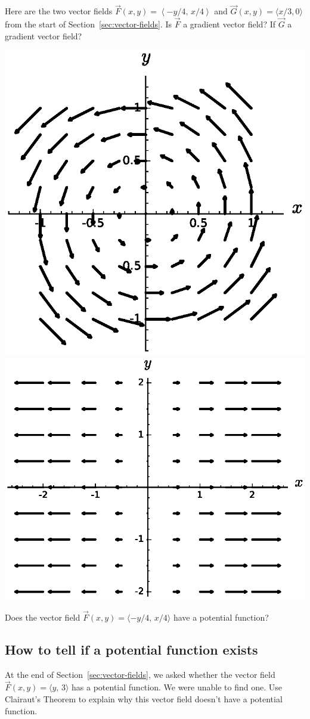 \begin{ex}
    Here are the two vector fields $\vec{F}(x,y)=\left\langle -y/4,\, x/4\right\rangle$ and $\vec{G}(x,y)=\langle x/3,0\rangle$ from the start of Section~\ref{sec:vector-fields}. Is $\vec{F}$ a gradient vector field? If $\vec{G}$ a gradient vector field?
    
    \includegraphics[width=.35\textwidth]{images/vf1.eps} \hfill 
    \includegraphics[width=.4\textwidth]{images/vf2.eps}\label{img:sage-vector-field-5}
\end{ex}

\vfill 

\begin{ex}
    Does the vector field $\vec{F}(x,y)=\langle -y/4,\, x/4\rangle$ have a potential function?
\end{ex}

\vspace{.5in}

\pagebreak 

\subsection{How to tell if a potential function exists}
\begin{ex} 
    At the end of Section~\ref{sec:vector-fields}, we asked whether the vector field $\vec{F}(x,y)=\langle y,\, 3\rangle$ has a potential function. We were unable to find one. Use Clairaut's Theorem to explain why this vector field doesn't have a potential function.
\end{ex}

\vspace{3in}

